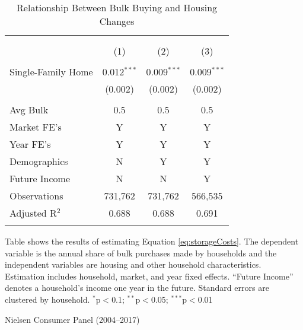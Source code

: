 \begin{table}[!htbp] \centering
  \caption{Relationship Between Bulk Buying and Housing Changes}
  \label{tab:storageCosts}
\begin{tabular}{@{\extracolsep{5pt}}lccc}
\\[-1.8ex]\hline
\hline \\[-1.8ex]
\\[-1.8ex] & (1) & (2) & (3)\\
\hline \\[-1.8ex]
 Single-Family Home & 0.012$^{***}$ & 0.009$^{***}$ & 0.009$^{***}$ \\
  & (0.002) & (0.002) & (0.002) \\
 \hline \\[-1.8ex]
Avg Bulk & 0.5 & 0.5 & 0.5 \\
Market FE's & Y & Y & Y \\
Year FE's & Y & Y & Y \\
Demographics & N & Y & Y \\
Future Income & N & N & Y \\
Observations & 731,762 & 731,762 & 566,535 \\
Adjusted R$^{2}$ & 0.688 & 0.688 & 0.691 \\
\hline
\hline \\[-1.8ex]
\end{tabular}
\begin{tablenotes}
Table shows the results of estimating Equation \ref{eq:storageCosts}. The dependent variable is the annual share of bulk purchases made by households and the independent variables are housing and other household characteristics. Estimation includes household, market, and year fixed effects. ``Future Income'' denotes a household's income one year in the future. Standard errors are clustered by household. $^{*}$p$<$0.1; $^{**}$p$<$0.05; $^{***}$p$<$0.01
\end{tablenotes}
\begin{tablenotes}[Source]
Nielsen Consumer Panel (2004--2017)
\end{tablenotes}
\end{table}
